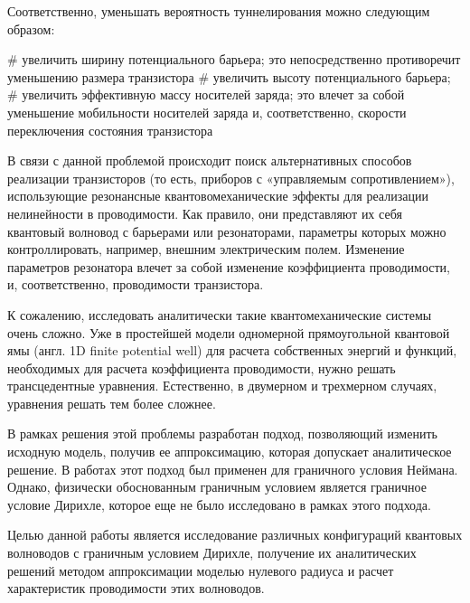 Соответственно, уменьшать вероятность туннелирования можно следующим образом:

\begin{easylist}[itemize]
# увеличить ширину потенциального барьера; это непосредственно противоречит уменьшению размера транзистора
# увеличить высоту потенциального барьера; 
# увеличить эффективную массу носителей заряда; это влечет за собой уменьшение мобильности носителей заряда и, соответственно, скорости переключения состояния транзистора
\end{easylist}

В связи с данной проблемой происходит поиск альтернативных способов реализации транзисторов (то есть, приборов с «управляемым сопротивлением»), использующие резонансные квантовомеханические эффекты для реализации нелинейности в проводимости. Как правило, они представляют их себя квантовый волновод с барьерами или резонаторами, параметры которых можно контроллировать, например, внешним электрическим полем.  Изменение параметров резонатора влечет за собой изменение коэффициента проводимости, и, соответственно, проводимости транзистора.

К сожалению, исследовать аналитически такие квантомеханические системы очень сложно.  Уже в простейшей модели одномерной прямоугольной квантовой ямы (англ. 1D finite potential well) для расчета собственных энергий и функций, необходимых для расчета коэффициента проводимости, нужно решать трансцедентные уравнения. Естественно, в двумерном и трехмерном случаях, уравнения решать тем более сложнее.

В рамках решения этой проблемы разработан подход, позволяющий изменить исходную модель, получив ее аппроксимацию, которая допускает аналитическое решение.  В работах  этот подход был применен для граничного условия Неймана. Однако, физически обоснованным граничным условием является граничное условие Дирихле, которое еще не было исследовано в рамках этого подхода.

Целью данной работы является исследование различных конфигураций квантовых волноводов с граничным условием Дирихле, получение их аналитических решений методом аппроксимации моделью нулевого радиуса и расчет характеристик проводимости этих волноводов.







